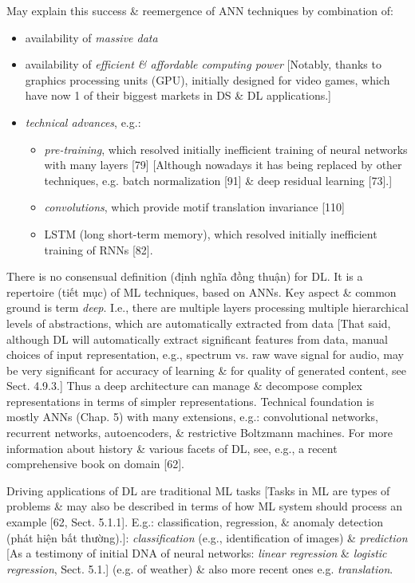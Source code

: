 \documentclass{article}
\begin{document}
\begin{itemize}
	May explain this success \& reemergence of ANN techniques by combination of:
	\begin{itemize}
		\item availability of {\it massive data}
		\item availability of {\it efficient \& affordable computing power} [Notably, thanks to graphics processing units (GPU), initially designed for video games, which have now 1 of their biggest markets in DS \& DL applications.]
		\item {\it technical advances}, e.g.:
		\begin{itemize}
			\item {\it pre-training}, which resolved initially inefficient training of neural networks with many layers [79] [Although nowadays it has being replaced by other techniques, e.g. batch normalization [91] \& deep residual learning [73].]
			\item {\it convolutions}, which provide motif translation invariance [110]
			\item LSTM (long short-term memory), which resolved initially inefficient training of RNNs [82].
		\end{itemize}
	\end{itemize}
	There is no consensual definition (định nghĩa đồng thuận) for DL. It is a repertoire (tiết mục) of ML techniques, based on ANNs. Key aspect \& common ground is term {\it deep}. I.e., there are multiple layers processing multiple hierarchical levels of abstractions, which are automatically extracted from data [That said, although DL will automatically extract significant features from data, manual choices of input representation, e.g., spectrum vs. raw wave signal for audio, may be very significant for accuracy of learning \& for quality of generated content, see Sect. 4.9.3.] Thus a deep architecture can manage \& decompose complex representations in terms of simpler representations. Technical foundation is mostly ANNs (Chap. 5) with many extensions, e.g.: convolutional networks, recurrent networks, autoencoders, \& restrictive Boltzmann machines. For more information about history \& various facets of DL, see, e.g., a recent comprehensive book on domain [62].
	
	Driving applications of DL are traditional ML tasks [Tasks in ML are types of problems \& may also be described in terms of how ML system should process an example [62, Sect. 5.1.1]. E.g.: classification, regression, \& anomaly detection (phát hiện bất thường).]: {\it classification} (e.g., identification of images) \& {\it prediction} [As a testimony of initial DNA of neural networks: {\it linear regression} \& {\it logistic regression}, Sect. 5.1.] (e.g. of weather) \& also more recent ones e.g. {\it translation}.
	

\end{itemize}
\end{document}
